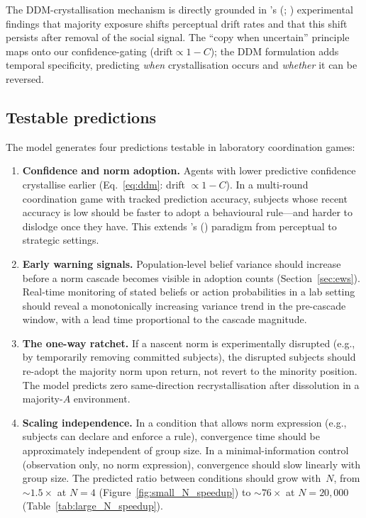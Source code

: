 \documentclass[11pt,a4paper]{article}
\begin{document}
The DDM-crystallisation mechanism is directly grounded in \citeauthor{germar2014social}'s (\citeyear{germar2014social}; \citeyear{germar2019learning}) experimental findings that majority exposure shifts perceptual drift rates and that this shift persists after removal of the social signal.  The ``copy when uncertain'' principle \citep{rendell2010copy,boyd1985culture} maps onto our confidence-gating ($\text{drift} \propto 1 - C$); the DDM formulation adds temporal specificity, predicting \emph{when} crystallisation occurs and \emph{whether} it can be reversed.

\subsection{Testable predictions}
\label{sec:predictions}

The model generates four predictions testable in laboratory coordination games:

\begin{enumerate}[nosep]
\item \textbf{Confidence and norm adoption.}  Agents with lower predictive confidence crystallise earlier (Eq.~\ref{eq:ddm}: drift $\propto 1 - C$).  In a multi-round coordination game with tracked prediction accuracy, subjects whose recent accuracy is low should be faster to adopt a behavioural rule---and harder to dislodge once they have.  This extends \citeauthor{germar2014social}'s (\citeyear{germar2014social}) paradigm from perceptual to strategic settings.

\item \textbf{Early warning signals.}  Population-level belief variance should increase before a norm cascade becomes visible in adoption counts (Section~\ref{sec:ews}).  Real-time monitoring of stated beliefs or action probabilities in a lab setting should reveal a monotonically increasing variance trend in the pre-cascade window, with a lead time proportional to the cascade magnitude.

\item \textbf{The one-way ratchet.}  If a nascent norm is experimentally disrupted (e.g., by temporarily removing committed subjects), the disrupted subjects should re-adopt the majority norm upon return, not revert to the minority position.  The model predicts zero same-direction recrystallisation after dissolution in a majority-$A$ environment.

\item \textbf{Scaling independence.}  In a condition that allows norm expression (e.g., subjects can declare and enforce a rule), convergence time should be approximately independent of group size.  In a minimal-information control (observation only, no norm expression), convergence should slow linearly with group size.  The predicted ratio between conditions should grow with~$N$, from ${\sim}1.5\times$ at $N{=}4$ (Figure~\ref{fig:small_N_speedup}) to ${\sim}76\times$ at $N{=}20{,}000$ (Table~\ref{tab:large_N_speedup}).
\end{enumerate}
\end{document}
